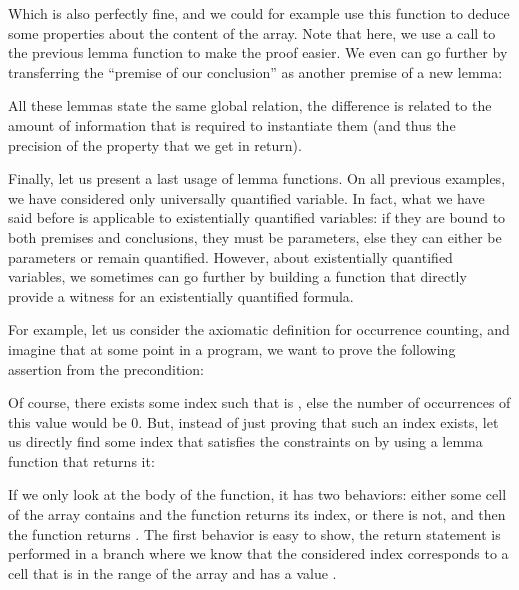 


Which is also perfectly fine, and we could for example use this function to
deduce some properties about the content of the array. Note that here, we use a
call to the previous lemma function to make the proof easier. We even can go
further by transferring the ``premise of our conclusion'' as another premise of
a new lemma:






All these lemmas state the same global relation, the difference is related to
the amount of information that is required to instantiate them (and thus the
precision of the property that we get in return).



Finally, let us present a last usage of lemma functions. On all previous
examples, we have considered only universally quantified variable. In fact, what
we have said before is applicable to existentially quantified variables: if they
are bound to both premises and conclusions, they must be parameters, else they
can either be parameters or remain quantified. However, about existentially
quantified variables, we sometimes can go further by building a function that
directly provide a witness for an existentially quantified formula.



For example, let us consider the axiomatic definition for occurrence counting,
and imagine that at some point in a program, we want to prove the following
assertion from the precondition:






Of course, there exists some index  such that 
is , else the number of occurrences of this value would be $0$.
But, instead of just proving that such an index exists, let us directly find
some index that satisfies the constraints on  by using a lemma
function that returns it:






If we only look at the body of the function, it has two behaviors: either some
cell of the array contains  and the function returns its index, or
there is not, and then the function returns . The first
behavior is easy to show, the return statement is performed in a branch where we
know that the considered index corresponds to a cell that is in the range of the
array and has a value .




